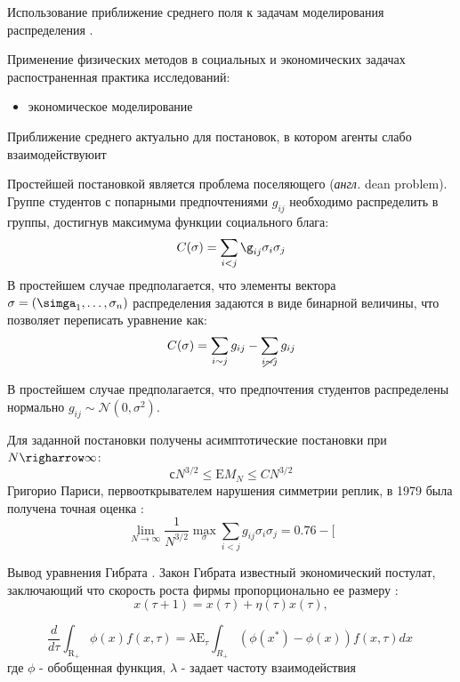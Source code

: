 
Использование приближение среднего поля к задачам моделирования
распределения \cite{toscani2016kinetic}.


Применение физических методов в социальных и экономических задачах 
распостраненная практика исследований: \begin{itemize}
    \item экономическое моделирование \cite{carmona2020applications}
\end{itemize}

Приближение среднего актуально для постановок, в котором 
агенты слабо взаимодействуюит


Простейшей постановкой является проблема поселяющего (\textit{англ.} dean problem).
Группе студентов с попарными предпочтениями $g_{ij}$ необходимо распределить в группы, достигнув
максимума функции социального блага:
\begin{equation}
    C(\sigma) = \sum_{i<j} \g_{ij} \sigma_i \sigma_j
\end{equation}
В простейшем случае предполагается, что элементы вектора 
$\mathbf{\sigma}=(\simga_1,\dots,\sigma_n)$ распределения задаются 
в виде бинарной величины, что позволяет переписать уравнение как:
\begin{equation}
    C(\sigma) = \sum_{i \sim j } g_{ij} - \sum_{i \cancel{\sim} j } g_{ij}  
\end{equation}


В простейшем случае предполагается, что предпочтения студентов
распределены нормально $g_{ij} \sim \mathcal{N}(0,\sigma^2)$.

Для заданной постановки получены асимптотические постановки 
при $N \righarrow \infty$: 
\begin{equation}
    с N^{3/2} \le \mathrm{E} M_N \le C N^{3/2}
\end{equation}
Григорио Париси, первооткрывателем нарушения симметрии реплик, в 1979 
была получена точная оценка \cite{parisi1979infinite}:
\begin{equation}
    \lim_{N \rightarrow \infty} \frac{1}{N^{3/2}} \max_\sigma \sum_{i<j} g_{ij} \sigma_i \sigma_j = 0.76-[
\end{equation}


Вывод уравнения Гибрата \cite{toscani2016kinetic}.
Закон Гибрата известный экономический постулат, заключающий
что скорость роста фирмы пропорционально ее размеру \cite{france2001inegalites}:
$$
    x(\tau +1) = x(\tau) + \eta(\tau) x(\tau),
$$

\begin{equation}
    \frac{d}{d \tau} \int_{\mathrm{R_+}} \phi(x) f(x,\tau )= \lambda \mathrm{E}_\tau \int_{R_+} (\phi(x^*) - \phi(x)) f(x,\tau) dx \>
\end{equation}
где $\phi$ - обобщенная функция, $\lambda$ - задает частоту взаимодействия

